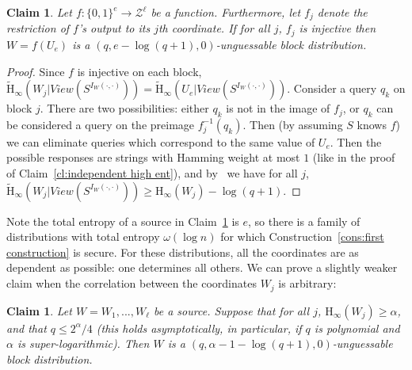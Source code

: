 \documentclass[11pt]{article}
\newcommand{\clref}[1]{\mbox{Claim~\ref{#1}}}
\newcommand{\consref}[1]{\mbox{Construction~\ref{#1}}}
\newcommand{\zo}{\ensuremath{\{0, 1\}}}
\newcommand{\Hoo}{\mathrm{H}_\infty}
\newcommand{\Hav}{\tilde{\mathrm{H}}_\infty}
\newtheorem{claim}[theorem]{Claim}
\begin{document}
\begin{claim}
\label{cl:each block from single seed}
Let $f:\zo^e \rightarrow \mathcal{Z}^\ell$ be a function.  Furthermore, let $f_j$ denote the restriction of $f$'s output to its $j$th coordinate.  If for all $j$, $f_j$ is injective then $W = f(U_e)$ is a $( q, e - \log (q+1), 0)$-unguessable block distribution.
\end{claim}
\begin{proof}
Since $f$ is injective on each block, $\Hav(W_j | View(S^{I_{W}(\cdot, \cdot)})) = \Hav(U_e | View(S^{I_{W}(\cdot, \cdot)}))$.  Consider a query $q_k$ on block $j$.  There are two possibilities: either $q_k$ is not in the image of $f_j$,  or $q_k$ can be considered a query on the preimage $f_j^{-1}(q_k)$. Then (by assuming $S$ knows $f$) we can eliminate queries which correspond to the same value of $U_e$.  Then the possible responses are strings with Hamming weight at most $1$ (like in the
proof of \clref{cl:independent high ent}),
 and by~\cite[Lemma 2.2]{DBLP:journals/siamcomp/DodisORS08} we have for all $j$, $\Hav(W_j | View(S^{I_{W}(\cdot, \cdot)})) \geq \Hoo(W_j) -\log (q+1)$.
\end{proof}

Note the total entropy of a source in \clref{cl:each block from single seed} is $e$, so there is a family of distributions with total entropy $\omega(\log n)$ for which \consref{cons:first construction} is secure.  For these distributions, all the coordinates are as dependent as possible: one determines all others.
We can prove a slightly weaker claim when the correlation between the coordinates $W_j$ is arbitrary:

\begin{claim}
\label{cl:all blocks entropy}
Let $W = W_1,..., W_\ell$ be a source.  Suppose that for all $j$, $\Hoo(W_j)\geq \alpha$, and that $q \le 2^{\alpha}/4$ (this holds asymptotically, in particular, if $q$ is polynomial and $\alpha$ is super-logarithmic). Then  $W$ is a $(q, \alpha-1-\log(q+1), 0)$-unguessable block distribution.
\end{claim}
\end{document}
